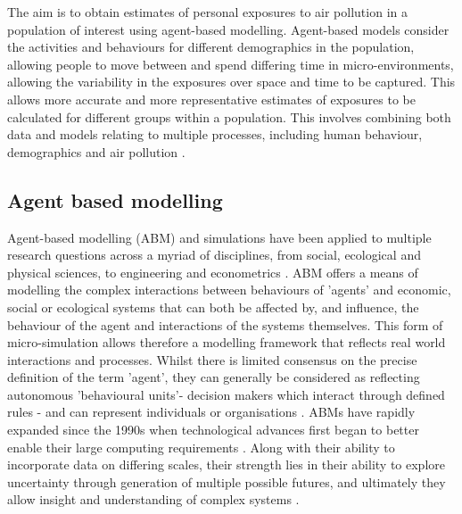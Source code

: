 \documentclass{article}
\begin{document}

The aim is to obtain estimates of personal exposures to air pollution in a population of interest using agent-based modelling.  Agent-based models consider the activities and behaviours for different demographics in the population, allowing people to move between and spend differing time in  micro-environments, allowing the variability in the exposures over space and time to be captured. This allows more accurate and more representative estimates of exposures to be calculated for different groups within a population. This involves combining both data and models  relating to multiple processes, including  human behaviour, demographics and air pollution \citep{ozkaynak2013air}. 


\subsection{Agent based modelling}


Agent-based modelling (ABM) and simulations  have been applied to multiple research questions across a myriad of disciplines, from social, ecological and physical sciences, to engineering and econometrics \cite{Macal2017EverythingSimulation}. ABM offers a means of modelling the complex interactions between behaviours of 'agents' and economic, social or ecological systems that can both be affected by, and influence, the behaviour of the agent and interactions of the systems themselves. \cite{Ghazi2014Multi-AgentReview, An2012ModelingModels} This form of micro-simulation allows therefore a modelling framework that  reflects real world interactions and processes. Whilst there is limited consensus on the precise definition of the term 'agent', they can generally be considered as reflecting autonomous 'behavioural units'- decision makers which interact through defined rules - and can represent individuals or organisations \cite{An2012ModelingModels, Crooks2012IntroductionModelling}. ABMs have rapidly expanded since the 1990s when technological advances first began to better enable their large computing requirements \cite{Macal2017EverythingSimulation}. Along with their ability to incorporate data on differing scales, their strength lies in their ability to explore uncertainty through generation of multiple possible futures, and ultimately they allow insight and understanding of complex systems \cite{Crooks2012IntroductionModelling}.\\
\end{document}
